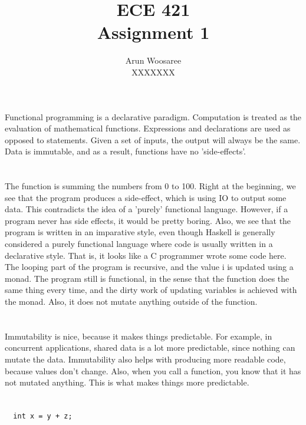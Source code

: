 \documentclass[letterpaper]{article}
\title{ECE 421 \\
Assignment 1}
\author{Arun Woosaree\\
XXXXXXX
}
\begin{document}
\maketitle %

\section{}
Functional programming is a declarative paradigm.
Computation is treated as the evaluation of mathematical functions.
Expressions and declarations are used as opposed to statements.
Given a set of inputs, the output will always be the same.
Data is immutable, and as a result,
functions have no 'side-effects'.

\section{}
The function is summing the numbers from 0 to 100.
Right at the beginning, we see that the program produces a side-effect, which
is using IO to output some data. This contradicts the idea of a 'purely'
functional language. However, if a program never has side effects, it would be
pretty boring.
Also, 
we see that the program is written in an imparative style, even though Haskell
is generally considered a purely functional language where code is usually
written in a declarative style. 
That is, it looks like a C programmer wrote some code here.
The looping part of the program is recursive,
and the value i is updated using a monad. The program still is functional,
in the sense that the function does the same thing every time, and the dirty
work of updating variables is achieved with the monad. Also, it does not mutate
anything outside of the function.


\section{}
Immutability is nice, because it makes things predictable.
For example, in concurrent applications, shared data is a lot more predictable,
since nothing can mutate the data. 
Immutability also helps with producing more readable code, because values don't
change. Also, when you call a function, you know that it has not mutated
anything. This is what makes things more predictable.

\section{}
\subsection{}
\begin{verbatim}
  int x = y + z;
\end{verbatim}
\end{document}
